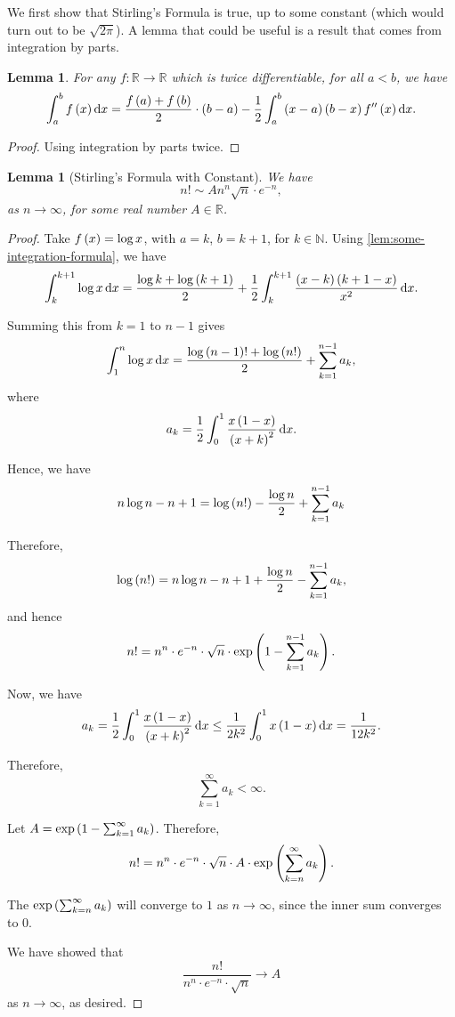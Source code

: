 \documentclass{article}
\newtheorem{lemma}[theorem]{Lemma}
\theoremstyle{definition}
\theoremstyle{remark}
\newcommand{\RR}{\mathbb{R}}
\newcommand{\NN}{\mathbb{N}}
\newcommand{\functiondomain}[3]{#1:#2\to #3}
\begin{document}
We first show that Stirling's Formula is true, up to some constant (which would turn out to be \(\sqrt{2\pi}\)). A lemma that could be useful is a result that comes from integration by parts.

\begin{lemma}
    \label{lem:some-integration-formula}%
    For any \(\functiondomain{f}{\RR}{\RR}\) which is twice differentiable, for all \(a < b\), we have
    \[
        \int_a^b f\pqty{x} \dd{x} = \frac{f\pqty{a} + f\pqty{b}}{2} \cdot \pqty{b - a} - \frac{1}{2} \int_a^b \pqty{x - a} \pqty{b - x} f''\pqty{x} \dd{x}.
    \]
\end{lemma}

\begin{proof}
    Using integration by parts twice.
\end{proof}


\begin{lemma}[Stirling's Formula with Constant]
    \label{lem:stirling-formula-constant}%
    We have
    \[
        n! \sim A n^n \sqrt{n} \cdot e^{-n},
    \]
    as \(n \to \infty\), for some real number \(A \in \RR\).
\end{lemma}

\begin{proof}
    Take \(f\left(x\right) = \log x\), with \(a = k\), \(b = k + 1\), for \(k \in \NN\). Using \autoref{lem:some-integration-formula}, we have
    \[
        \int_{k}^{k + 1} \log x \dd{x} = \frac{\log k + \log\pqty{k + 1}}{2} + \frac{1}{2} \int_{k}^{k + 1} \frac{\pqty{x - k} \pqty{k + 1 - x}}{x^2} \dd{x}.
    \]

    Summing this from \(k = 1\) to \(n - 1\) gives
    \[
        \int_{1}^{n} \log x \dd{x} = \frac{\log \pqty{n - 1}! + \log \pqty{n!}}{2} + \sum_{k = 1}^{n - 1} a_k,
    \]
    where
    \[
        a_k = \frac{1}{2} \int_{0}^{1} \frac{x \pqty{1 - x}}{\pqty{x + k}^2} \dd{x}.
    \]

    Hence, we have
    \[
        n \log n - n + 1 = \log\left(n!\right) - \frac{\log n}{2} + \sum_{k = 1}^{n - 1} a_k
    \]

    Therefore,
    \[
        \log \left(n!\right) = n \log n - n + 1 + \frac{\log n}{2} - \sum_{k = 1}^{n - 1} a_k,
    \]
    and hence
    \[
        n! = n^n \cdot e^{-n} \cdot \sqrt{n} \cdot \exp\left(1 - \sum_{k = 1}^{n - 1} a_k\right).
    \]

    Now, we have
    \[
        a_k = \frac{1}{2} \int_{0}^{1} \frac{x \pqty{1 - x}}{\pqty{x + k}^2} \dd{x} \leq \frac{1}{2k^2} \int_{0}^{1} x\pqty{1 - x} \dd{x} = \frac{1}{12k^2}.
    \]

    Therefore,
    \[
        \sum_{k = 1}^{\infty} a_k < \infty.
    \]

    Let \(A = \exp\left(1 - \sum_{k = 1}^{\infty} a_k\right)\). Therefore,
    \[
        n! = n^n \cdot e^{-n} \cdot \sqrt{n} \cdot A \cdot \exp\left(\sum_{k = n}^{\infty} a_k\right).
    \]

    The \(\exp\left(\sum_{k = n}^{\infty} a_k\right)\) will converge to \(1\) as \(n \to \infty\), since the inner sum converges to \(0\).

    We have showed that
    \[
        \frac{n!}{n^n \cdot e^{-n} \cdot \sqrt{n}} \to A
    \]
    as \(n \to \infty\), as desired.
\end{proof}
\end{document}
